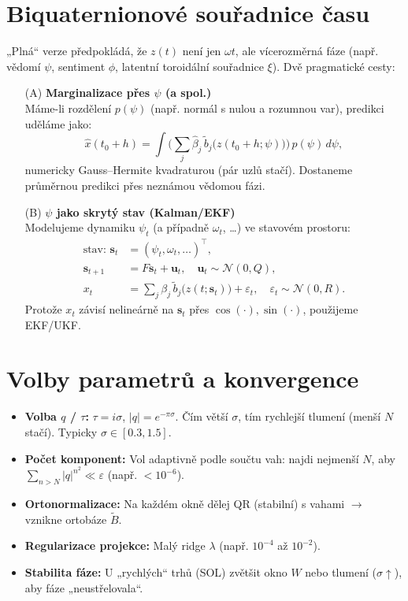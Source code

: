 \documentclass[12pt, a4paper]{article}
\begin{document}
\section{Biquaternionové souřadnice času}
„Plná“ verze předpokládá, že $z(t)$ není jen $\omega t$, ale vícerozměrná fáze (např. vědomí $\psi$, sentiment $\phi$, latentní toroidální souřadnice $\xi$). Dvě pragmatické cesty:

\begin{itemize}
    \item[(A)] \textbf{Marginalizace přes $\psi$ (a spol.)} \\
    Máme-li rozdělení $p(\psi)$ (např. normál s nulou a rozumnou var), predikci uděláme jako:
    $$
    \hat{x}(t_0+h) = \int \Big( \sum_j \hat\beta_j\, \tilde{b}_j\big(z(t_0{+}h;\psi)\big)\Big)\, p(\psi)\, d\psi,
    $$
    numericky Gauss–Hermite kvadraturou (pár uzlů stačí). Dostaneme průměrnou predikci přes neznámou vědomou fázi.

    \item[(B)] \textbf{$\psi$ jako skrytý stav (Kalman/EKF)} \\
    Modelujeme dynamiku $\psi_t$ (a případně $\omega_t$, \ldots) ve stavovém prostoru:
    \begin{align*}
    \text{stav: } \mathbf{s}_t &= (\psi_t, \omega_t, \ldots)^\top,\\
    \mathbf{s}_{t+1} &= F \mathbf{s}_t + \mathbf{u}_t,\quad \mathbf{u}_t\sim\mathcal{N}(0,Q),\\
    x_t &= \sum_j \beta_j\, \tilde{b}_j\big(z(t;\mathbf{s}_t)\big) + \varepsilon_t,\quad \varepsilon_t\sim\mathcal{N}(0,R).
    \end{align*}
    Protože $x_t$ závisí nelineárně na $\mathbf{s}_t$ přes $\cos(\cdot),\sin(\cdot)$, použijeme EKF/UKF.
\end{itemize}

\section{Volby parametrů a konvergence}
\begin{itemize}
    \item \textbf{Volba $q$ / $\tau$:} $\tau = i \sigma$, $|q| = e^{-\pi \sigma}$. Čím větší $\sigma$, tím rychlejší tlumení (menší $N$ stačí). Typicky $\sigma \in [0.3, 1.5]$.
    \item \textbf{Počet komponent:} Vol adaptivně podle součtu vah: najdi nejmenší $N$, aby $\sum_{n>N} |q|^{n^2} \ll \varepsilon$ (např. $<10^{-6}$).
    \item \textbf{Ortonormalizace:} Na každém okně dělej QR (stabilní) s vahami $\rightarrow$ vznikne ortobáze $\tilde{B}$.
    \item \textbf{Regularizace projekce:} Malý ridge $\lambda$ (např. $10^{-4}$ až $10^{-2}$).
    \item \textbf{Stabilita fáze:} U „rychlých“ trhů (SOL) zvětšit okno $W$ nebo tlumení ($\sigma\uparrow$), aby fáze „neustřelovala“.
\end{itemize}
\end{document}

